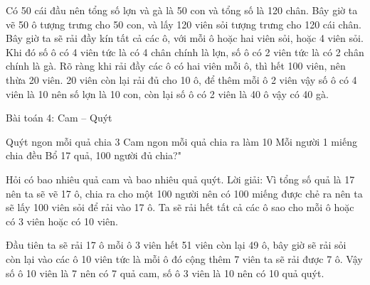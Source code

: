 \begin{multicols}{2}
	Có 50 cái đầu nên tổng số lợn và gà là 50 con và tổng số là 120 chân. Bây giờ ta vẽ 50 ô tượng trưng cho 50 con, và lấy 120 viên sỏi tượng trưng cho 120 cái chân.
	Bây giờ ta sẽ rải đầy kín tất cả các ô, với mỗi ô hoặc hai viên sỏi, hoặc 4 viên sỏi. Khi đó số ô có 4 viên tức là có 4 chân chính là lợn, số ô có 2 viên tức là có 2 chân chính là gà.
	Rõ ràng khi rải đầy các ô có hai viên mỗi ô, thì hết 100 viên, nên thừa 20 viên. 20 viên còn lại rải đủ cho 10 ô, để thêm mỗi ô 2 viên vậy số ô có 4 viên là 10 nên số lợn là 10 con, còn lại số ô có 2 viên là 40 ô vậy có 40 gà.
	
	
	Bài toán 4: Cam – Quýt
	
	
	
	Quýt ngon mỗi quả chia 3 Cam ngon mỗi quả chia ra làm 10
	Mỗi người 1 miếng chia đều Bổ 17 quả, 100 người đủ chia?"
	
	Hỏi có bao nhiêu quả cam và bao nhiêu quả quýt.
	Lời giải:
	Vì tổng số quả là 17 nên ta sẽ vẽ 17 ô, chia ra cho một 100 người nên có 100 miếng được chẻ ra nên ta sẽ lấy 100 viên sỏi để rải vào 17 ô.
	Ta sẽ rải hết tất cả các ô sao cho mỗi ô hoặc có 3 viên hoặc có 10 viên.
	
	Đầu tiên ta sẽ rải 17 ô mỗi ô 3 viên hết 51 viên còn lại 49 ô, bây giờ sẽ rải sỏi còn lại vào các ô 10 viên tức là mỗi ô đó cộng thêm 7 viên ta sẽ rải được 7 ô. Vậy số ô 10 viên là 7 nên có 7 quả cam, số ô 3 viên là 10 nên có 10 quả quýt.
	
	
	
	
	
	
	
	
	
	
	
	
	
	
	
	
	
	
	
	
	
	
	
	
	
	
	
	
	
	
	
	
	
	
	
	
	
	
	
	
	
	
	
	
	
	
	
	
	
	
	
	
	

\end{multicols}
